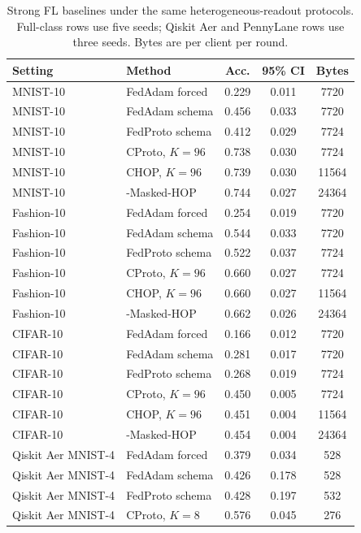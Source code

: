 \begin{table}[t]
\centering
\caption{Strong FL baselines under the same heterogeneous-readout protocols. Full-class rows use five seeds; Qiskit Aer and PennyLane rows use three seeds. Bytes are per client per round.}
\label{tab:strong-baselines}
\scriptsize
\renewcommand{\arraystretch}{0.93}
\begin{tabular}{llccc}
\toprule
Setting & Method & Acc. & 95\% CI & Bytes \\
\midrule
MNIST-10 & FedAdam forced & 0.229 & 0.011 & 7720 \\
MNIST-10 & FedAdam schema & 0.456 & 0.033 & 7720 \\
MNIST-10 & FedProto schema & 0.412 & 0.029 & 7724 \\
MNIST-10 & CProto, \(K=96\) & 0.738 & 0.030 & 7724 \\
MNIST-10 & CHOP, \(K=96\) & 0.739 & 0.030 & 11564 \\
MNIST-10 & \method{}-Masked-HOP & 0.744 & 0.027 & 24364 \\
\midrule
Fashion-10 & FedAdam forced & 0.254 & 0.019 & 7720 \\
Fashion-10 & FedAdam schema & 0.544 & 0.033 & 7720 \\
Fashion-10 & FedProto schema & 0.522 & 0.037 & 7724 \\
Fashion-10 & CProto, \(K=96\) & 0.660 & 0.027 & 7724 \\
Fashion-10 & CHOP, \(K=96\) & 0.660 & 0.027 & 11564 \\
Fashion-10 & \method{}-Masked-HOP & 0.662 & 0.026 & 24364 \\
\midrule
CIFAR-10 & FedAdam forced & 0.166 & 0.012 & 7720 \\
CIFAR-10 & FedAdam schema & 0.281 & 0.017 & 7720 \\
CIFAR-10 & FedProto schema & 0.268 & 0.019 & 7724 \\
CIFAR-10 & CProto, \(K=96\) & 0.450 & 0.005 & 7724 \\
CIFAR-10 & CHOP, \(K=96\) & 0.451 & 0.004 & 11564 \\
CIFAR-10 & \method{}-Masked-HOP & 0.454 & 0.004 & 24364 \\
\midrule
Qiskit Aer MNIST-4 & FedAdam forced & 0.379 & 0.034 & 528 \\
Qiskit Aer MNIST-4 & FedAdam schema & 0.426 & 0.178 & 528 \\
Qiskit Aer MNIST-4 & FedProto schema & 0.428 & 0.197 & 532 \\
Qiskit Aer MNIST-4 & CProto, \(K=8\) & 0.576 & 0.045 & 276 \\

\end{tabular}
\end{table}

